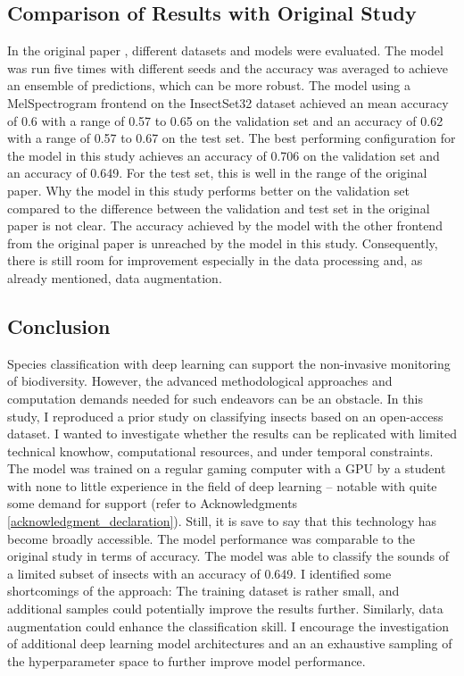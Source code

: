 \subsection{Comparison of Results with Original Study}%

In the original paper \autocite{faissAdaptiveRepresentationsSound2023},
different datasets and models were evaluated. The model was
run five times with different seeds and the accuracy was averaged to achieve an ensemble of predictions, 
which can be more robust. The model using a MelSpectrogram
frontend on the InsectSet32 dataset achieved an mean accuracy of 0.6 with a range of 0.57 to 0.65
on the validation set and an accuracy of 0.62 with a range of 0.57 to 0.67 on the test set.
The best performing configuration for the model in this study achieves an accuracy of 0.706 on the validation set
and an accuracy of 0.649. For the test set, this is well in the range of the original paper.
Why the model in this study performs better on the validation set compared to the difference
between the validation and test set in the original paper is not clear. The accuracy achieved
by the model with the other frontend from the original paper is unreached by the model in this study.
Consequently, there is still room for improvement especially in the data processing and, as already mentioned, data augmentation.

\subsection{Conclusion}%

Species classification with deep learning can support the non-invasive monitoring of biodiversity.
However, the advanced methodological approaches and computation demands needed for such endeavors can be an obstacle.
In this study, I reproduced a prior study on classifying insects based on an open-access dataset.
I wanted to investigate whether the results can be replicated with limited technical knowhow, 
computational resources, and under temporal constraints.
The model was trained on a regular gaming computer with a GPU by a student with none to little experience
in the field of deep learning -- notable with quite some demand for support (refer to Acknowledgments \ref{acknowledgment_declaration}).
Still, it is save to say that this technology has become broadly accessible.
The model performance was comparable to the original study in terms of accuracy.
The model was able to classify the sounds of a limited subset of insects with an accuracy of 0.649.
I identified some shortcomings of the approach:
The training dataset is rather small, and additional samples could potentially improve the results further.
Similarly, data augmentation could enhance the classification skill.
I encourage the investigation of additional deep learning model architectures and 
an an exhaustive sampling of the hyperparameter space to further improve model performance.
